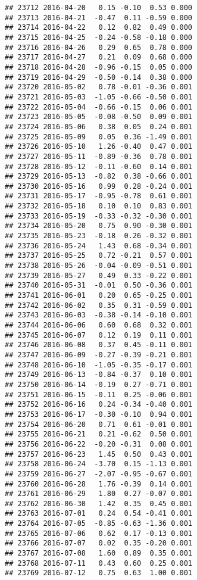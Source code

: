 \documentclass[
]{article}
\begin{document}
\begin{verbatim}
## 23712 2016-04-20   0.15 -0.10  0.53 0.000
## 23713 2016-04-21  -0.47  0.11 -0.59 0.000
## 23714 2016-04-22   0.12  0.82  0.49 0.000
## 23715 2016-04-25  -0.24 -0.58 -0.18 0.000
## 23716 2016-04-26   0.29  0.65  0.78 0.000
## 23717 2016-04-27   0.21  0.09  0.68 0.000
## 23718 2016-04-28  -0.96 -0.15  0.05 0.000
## 23719 2016-04-29  -0.50 -0.14  0.38 0.000
## 23720 2016-05-02   0.78 -0.01 -0.36 0.001
## 23721 2016-05-03  -1.05 -0.66 -0.50 0.001
## 23722 2016-05-04  -0.66 -0.15  0.06 0.001
## 23723 2016-05-05  -0.08 -0.50  0.09 0.001
## 23724 2016-05-06   0.38  0.05  0.24 0.001
## 23725 2016-05-09   0.05  0.36 -1.49 0.001
## 23726 2016-05-10   1.26 -0.40  0.47 0.001
## 23727 2016-05-11  -0.89 -0.36  0.78 0.001
## 23728 2016-05-12  -0.11 -0.60  0.14 0.001
## 23729 2016-05-13  -0.82  0.38 -0.66 0.001
## 23730 2016-05-16   0.99  0.28 -0.24 0.001
## 23731 2016-05-17  -0.95 -0.78  0.61 0.001
## 23732 2016-05-18   0.10  0.10  0.83 0.001
## 23733 2016-05-19  -0.33 -0.32 -0.30 0.001
## 23734 2016-05-20   0.75  0.90 -0.30 0.001
## 23735 2016-05-23  -0.18  0.26 -0.32 0.001
## 23736 2016-05-24   1.43  0.68 -0.34 0.001
## 23737 2016-05-25   0.72 -0.21  0.57 0.001
## 23738 2016-05-26  -0.04 -0.09 -0.51 0.001
## 23739 2016-05-27   0.49  0.33 -0.22 0.001
## 23740 2016-05-31  -0.01  0.50 -0.36 0.001
## 23741 2016-06-01   0.20  0.65 -0.25 0.001
## 23742 2016-06-02   0.35  0.31 -0.59 0.001
## 23743 2016-06-03  -0.38 -0.14 -0.10 0.001
## 23744 2016-06-06   0.60  0.68  0.32 0.001
## 23745 2016-06-07   0.12  0.19  0.11 0.001
## 23746 2016-06-08   0.37  0.45 -0.11 0.001
## 23747 2016-06-09  -0.27 -0.39 -0.21 0.001
## 23748 2016-06-10  -1.05 -0.35 -0.17 0.001
## 23749 2016-06-13  -0.84 -0.37  0.10 0.001
## 23750 2016-06-14  -0.19  0.27 -0.71 0.001
## 23751 2016-06-15  -0.11  0.25 -0.06 0.001
## 23752 2016-06-16   0.24 -0.34 -0.40 0.001
## 23753 2016-06-17  -0.30 -0.10  0.94 0.001
## 23754 2016-06-20   0.71  0.61 -0.01 0.001
## 23755 2016-06-21   0.21 -0.62  0.50 0.001
## 23756 2016-06-22  -0.20 -0.31  0.08 0.001
## 23757 2016-06-23   1.45  0.50  0.43 0.001
## 23758 2016-06-24  -3.70  0.15 -1.13 0.001
## 23759 2016-06-27  -2.07 -0.95 -0.67 0.001
## 23760 2016-06-28   1.76 -0.39  0.14 0.001
## 23761 2016-06-29   1.80  0.27 -0.07 0.001
## 23762 2016-06-30   1.42  0.35  0.45 0.001
## 23763 2016-07-01   0.24  0.54 -0.41 0.001
## 23764 2016-07-05  -0.85 -0.63 -1.36 0.001
## 23765 2016-07-06   0.62  0.17 -0.13 0.001
## 23766 2016-07-07   0.02  0.35 -0.20 0.001
## 23767 2016-07-08   1.60  0.89  0.35 0.001
## 23768 2016-07-11   0.43  0.60  0.25 0.001
## 23769 2016-07-12   0.75  0.63  1.00 0.001

\end{verbatim}
\end{document}
